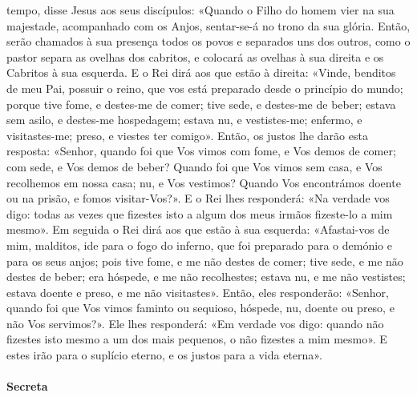 \begin{paracol}{2}
{ tempo, disse Jesus aos seus discípulos: «Quando o Filho do homem vier na sua majestade, acompanhado com os Anjos, sentar-se-á no trono da sua glória. Então, serão chamados à sua presença todos os povos e separados uns dos outros, como o pastor separa as ovelhas dos cabritos, e colocará as ovelhas à sua direita e os Cabritos à sua esquerda. E o Rei dirá aos que estão à direita: «Vinde, benditos de meu Pai, possuir o reino, que vos está preparado desde o princípio do mundo; porque tive fome, e destes-me de comer; tive sede, e destes-me de beber; estava sem asilo, e destes-me hospedagem; estava nu, e vestistes-me; enfermo, e visitastes-me; preso, e viestes ter comigo». Então, os justos lhe darão esta resposta: «Senhor, quando foi que Vos vimos com fome, e Vos demos de comer; com sede, e Vos demos de beber? Quando foi que Vos vimos sem casa, e Vos recolhemos em nossa casa; nu, e Vos vestimos? Quando Vos encontrámos doente ou na prisão, e fomos visitar-Vos?». E o Rei lhes responderá: «Na verdade vos digo: todas as vezes que fizestes isto a algum dos meus irmãos fizeste-lo a mim mesmo». Em seguida o Rei dirá aos que estão à sua esquerda: «Afastai-vos de mim, malditos, ide para o fogo do inferno, que foi preparado para o demónio e para os seus anjos; pois tive fome, e me não destes de comer; tive sede, e me não destes de beber; era hóspede, e me não recolhestes; estava nu, e me não vestistes; estava doente e preso, e me não visitastes». Então, eles responderão: «Senhor, quando foi que Vos vimos faminto ou sequioso, hóspede, nu, doente ou preso, e não Vos servimos?». Ele lhes responderá: «Em verdade vos digo: quando não fizestes isto mesmo a um dos mais pequenos, o não fizestes a mim mesmo». E estes irão para o suplício eterno, e os justos para a vida eterna».
}\end{paracol}

\begin{paracol}{2}\switchcolumn{}\end{paracol}

\paragraph{Secreta}
\begin{paracol}{2}\switchcolumn{}\end{paracol}

